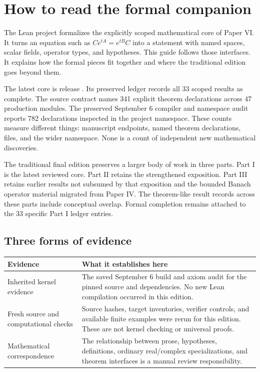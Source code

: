 \section{How to read the formal companion}
\label{sec:reading}
The Lean project formalizes the explicitly scoped mathematical core of Paper VI. It turns an equation such as $Ce^{tA}=e^{tB}C$ into a statement with named spaces, scalar fields, operator types, and hypotheses. This guide follows those interfaces. It explains how the formal pieces fit together and where the traditional edition goes beyond them.

The latest core is release . Its preserved ledger records all 33 scoped results as complete. The source contract names 341 explicit theorem declarations across 47 production modules. The preserved September 6 compiler and namespace audit reports 782 declarations inspected in the project namespace. These counts measure different things: manuscript endpoints, named theorem declarations, files, and the wider namespace. None is a count of independent new mathematical discoveries.

The traditional final edition preserves a larger body of work in three parts. Part I is the latest reviewed core. Part II retains the strengthened exposition. Part III retains earlier results not subsumed by that exposition and the bounded Banach operator material migrated from Paper IV. The theorem-like result records across these parts include conceptual overlap. Formal completion remains attached to the 33 specific Part I ledger entries.

\subsection{Three forms of evidence}
\begin{longtable}{@{}p{.23\linewidth}p{.70\linewidth}@{}}
\toprule Evidence & What it establishes here\\\midrule\endhead
Inherited kernel evidence & The saved September 6 build and axiom audit for the pinned source and dependencies. No new Lean compilation occurred in this edition.\\
Fresh source and computational checks & Source hashes, target inventories, verifier controls, and available finite examples were rerun for this edition. These are not kernel checking or universal proofs.\\
Mathematical correspondence & The relationship between prose, hypotheses, definitions, ordinary real/complex specializations, and theorem interfaces is a manual review responsibility.\\
\bottomrule\end{longtable}

